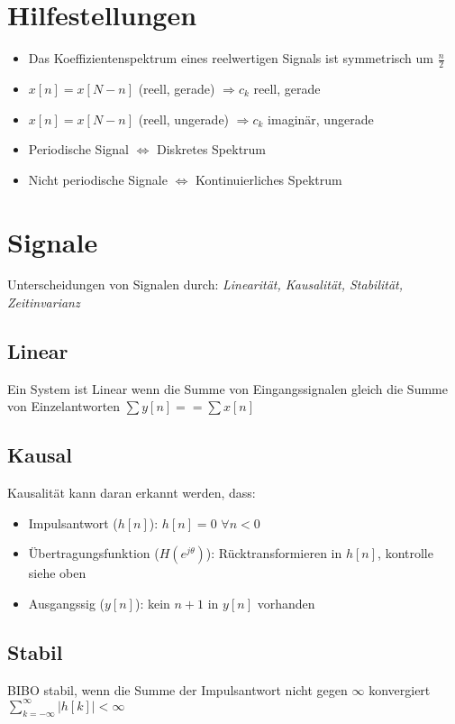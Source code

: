 \documentclass[a4paper, 12pt]{article}
\begin{document}
\section{Hilfestellungen}

\begin{itemize}
    \item Das Koeffizientenspektrum eines reelwertigen Signals ist symmetrisch um
          $\frac{n}{2}$
    \item $x[n] = x[N-n]$ (reell, gerade) $⇒c_k$ reell, gerade
    \item $x[n] = x[N-n]$ (reell, ungerade) $⇒c_k$ imaginär, ungerade
    \item Periodische Signal $⇔$ Diskretes Spektrum
    \item Nicht periodische Signale $⇔$ Kontinuierliches Spektrum
\end{itemize}

\section{Signale}
Unterscheidungen von Signalen durch: \textit{Linearität, Kausalität, Stabilität, Zeitinvarianz}
\subsection{Linear}
Ein System ist Linear wenn die Summe von Eingangssignalen gleich die Summe von Einzelantworten $ ∑ y[n] == ∑ x[n] $

\subsection{Kausal}
Kausalität kann daran erkannt werden, dass:
\begin{itemize}
  \item Impulsantwort ($h[n]$): $h[n]=0$ $\forall n<0$
  \item Übertragungsfunktion ($H(e^{j\theta})$): Rücktransformieren in $h[n]$, kontrolle siehe oben
  \item Ausgangssig ($y[n]$): kein $n+1$ in $y[n]$ vorhanden
\end{itemize}

\subsection{Stabil}
BIBO stabil, wenn die Summe der Impulsantwort nicht gegen $\infty$ konvergiert
$\sum_{k=-\infty}^{\infty} |h[k]| < \infty$
\end{document}
